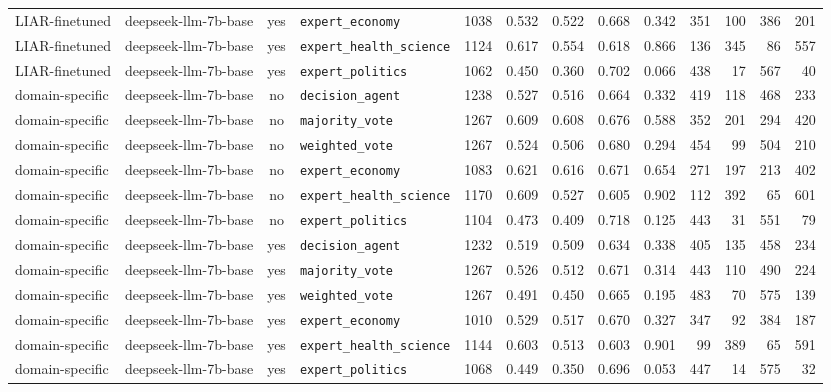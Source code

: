 \begin{landscape}
\begin{longtable}{@{}l p{3.2cm} c l r r r r r r r r r@{}}
LIAR-finetuned & deepseek-llm-7b-base & yes & \texttt{expert\_economy} & 1038 & 0.532 & 0.522 & 0.668 & 0.342 & 351 & 100 & 386 & 201\\
LIAR-finetuned & deepseek-llm-7b-base & yes & \texttt{expert\_health\_science} & 1124 & 0.617 & 0.554 & 0.618 & 0.866 & 136 & 345 & 86 & 557\\
LIAR-finetuned & deepseek-llm-7b-base & yes & \texttt{expert\_politics} & 1062 & 0.450 & 0.360 & 0.702 & 0.066 & 438 & 17 & 567 & 40\\
\midrule
domain-specific & deepseek-llm-7b-base & no & \texttt{decision\_agent} & 1238 & 0.527 & 0.516 & 0.664 & 0.332 & 419 & 118 & 468 & 233\\
domain-specific & deepseek-llm-7b-base & no & \texttt{majority\_vote} & 1267 & 0.609 & 0.608 & 0.676 & 0.588 & 352 & 201 & 294 & 420\\
domain-specific & deepseek-llm-7b-base & no & \texttt{weighted\_vote} & 1267 & 0.524 & 0.506 & 0.680 & 0.294 & 454 & 99 & 504 & 210\\
domain-specific & deepseek-llm-7b-base & no & \texttt{expert\_economy} & 1083 & 0.621 & 0.616 & 0.671 & 0.654 & 271 & 197 & 213 & 402\\
domain-specific & deepseek-llm-7b-base & no & \texttt{expert\_health\_science} & 1170 & 0.609 & 0.527 & 0.605 & 0.902 & 112 & 392 & 65 & 601\\
domain-specific & deepseek-llm-7b-base & no & \texttt{expert\_politics} & 1104 & 0.473 & 0.409 & 0.718 & 0.125 & 443 & 31 & 551 & 79\\
domain-specific & deepseek-llm-7b-base & yes & \texttt{decision\_agent} & 1232 & 0.519 & 0.509 & 0.634 & 0.338 & 405 & 135 & 458 & 234\\
domain-specific & deepseek-llm-7b-base & yes & \texttt{majority\_vote} & 1267 & 0.526 & 0.512 & 0.671 & 0.314 & 443 & 110 & 490 & 224\\
domain-specific & deepseek-llm-7b-base & yes & \texttt{weighted\_vote} & 1267 & 0.491 & 0.450 & 0.665 & 0.195 & 483 & 70 & 575 & 139\\
domain-specific & deepseek-llm-7b-base & yes & \texttt{expert\_economy} & 1010 & 0.529 & 0.517 & 0.670 & 0.327 & 347 & 92 & 384 & 187\\
domain-specific & deepseek-llm-7b-base & yes & \texttt{expert\_health\_science} & 1144 & 0.603 & 0.513 & 0.603 & 0.901 & 99 & 389 & 65 & 591\\
domain-specific & deepseek-llm-7b-base & yes & \texttt{expert\_politics} & 1068 & 0.449 & 0.350 & 0.696 & 0.053 & 447 & 14 & 575 & 32\\

\end{longtable}
\end{landscape}

